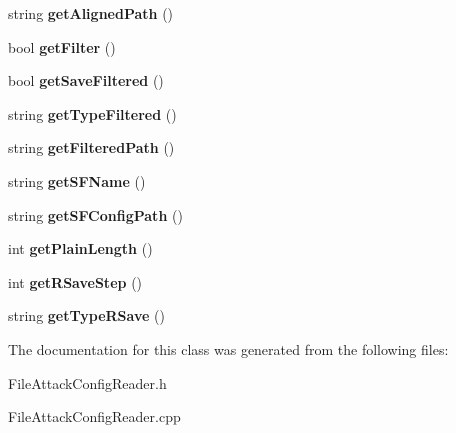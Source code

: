 \begin{DoxyCompactItemize}
\item 
\hypertarget{classFileAttackConfigReader_af6483f3ad3444e9bbc95ca1e7dced1be}{
string {\bfseries getAlignedPath} ()}
\label{classFileAttackConfigReader_af6483f3ad3444e9bbc95ca1e7dced1be}

\item 
\hypertarget{classFileAttackConfigReader_afe63d0b250964441c977a681457cd557}{
bool {\bfseries getFilter} ()}
\label{classFileAttackConfigReader_afe63d0b250964441c977a681457cd557}

\item 
\hypertarget{classFileAttackConfigReader_a26a06a77a7d6ad7244e078b956963243}{
bool {\bfseries getSaveFiltered} ()}
\label{classFileAttackConfigReader_a26a06a77a7d6ad7244e078b956963243}

\item 
\hypertarget{classFileAttackConfigReader_aefb1f7b16d69e6c5479c6191e1ac98ff}{
string {\bfseries getTypeFiltered} ()}
\label{classFileAttackConfigReader_aefb1f7b16d69e6c5479c6191e1ac98ff}

\item 
\hypertarget{classFileAttackConfigReader_a02c92777790fc6dc71db370b02452a41}{
string {\bfseries getFilteredPath} ()}
\label{classFileAttackConfigReader_a02c92777790fc6dc71db370b02452a41}

\item 
\hypertarget{classFileAttackConfigReader_a5bddf6e5442345b815701194c99431a2}{
string {\bfseries getSFName} ()}
\label{classFileAttackConfigReader_a5bddf6e5442345b815701194c99431a2}

\item 
\hypertarget{classFileAttackConfigReader_ad7bde6b9cd17d95dd54e4332ebfc8cf3}{
string {\bfseries getSFConfigPath} ()}
\label{classFileAttackConfigReader_ad7bde6b9cd17d95dd54e4332ebfc8cf3}

\item 
\hypertarget{classFileAttackConfigReader_a9dd42024e1cbd538274b2461b3953a20}{
int {\bfseries getPlainLength} ()}
\label{classFileAttackConfigReader_a9dd42024e1cbd538274b2461b3953a20}

\item 
\hypertarget{classFileAttackConfigReader_a013462cae339319ad57ba33bce1296b9}{
int {\bfseries getRSaveStep} ()}
\label{classFileAttackConfigReader_a013462cae339319ad57ba33bce1296b9}

\item 
\hypertarget{classFileAttackConfigReader_a47e561f5312c16790dc2f22067defc98}{
string {\bfseries getTypeRSave} ()}
\label{classFileAttackConfigReader_a47e561f5312c16790dc2f22067defc98}

\end{DoxyCompactItemize}


The documentation for this class was generated from the following files:\begin{DoxyCompactItemize}
\item 
FileAttackConfigReader.h\item 
FileAttackConfigReader.cpp\end{DoxyCompactItemize}
